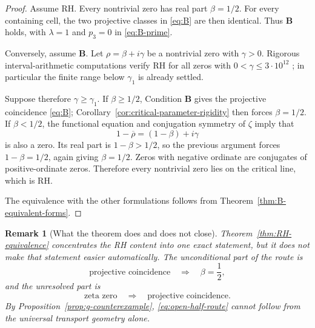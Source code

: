\documentclass[11pt]{amsart}
\numberwithin{equation}{section}
\newtheorem{remark}[theorem]{Remark}
\begin{document}
\begin{proof}
Assume RH.  Every nontrivial zero has real part $\beta=1/2$.  For every
containing cell, the two projective classes in \eqref{eq:B} are then
identical.  Thus $\mathbf B$ holds, with $\lambda=1$ and $p_3=0$ in
\eqref{eq:B-prime}.

Conversely, assume $\mathbf B$.  Let $\rho=\beta+i\gamma$ be a nontrivial
zero with $\gamma>0$.  Rigorous interval-arithmetic computations verify RH for
all zeros with $0<\gamma\leq3\cdot10^{12}$
\cite{PlattTrudgian2021}; in particular the finite range below
$\gamma_1$ is already settled.

Suppose therefore $\gamma\geq\gamma_1$.  If $\beta\geq1/2$, Condition
$\mathbf B$ gives the projective coincidence \eqref{eq:B};
Corollary~\ref{cor:critical-parameter-rigidity} then forces
$\beta=1/2$.  If $\beta<1/2$, the functional equation and conjugation symmetry
of $\zeta$ imply that
\begin{equation}
 1-\overline\rho=(1-\beta)+i\gamma
 \label{eq:zero-symmetry}
\end{equation}
is also a zero.  Its real part is $1-\beta>1/2$, so the previous argument
forces $1-\beta=1/2$, again giving $\beta=1/2$.  Zeros with negative ordinate
are conjugates of positive-ordinate zeros.  Therefore every nontrivial zero
lies on the critical line, which is RH.

The equivalence with the other formulations follows from
Theorem~\ref{thm:B-equivalent-forms}.
\end{proof}

\begin{remark}[What the theorem does and does not close]
\label{rem:RH-content}
Theorem~\ref{thm:RH-equivalence} concentrates the RH content into one exact
statement, but it does not make that statement easier automatically.  The
unconditional part of the route is
\begin{equation}
 \text{projective coincidence}
 \quad\Longrightarrow\quad
 \beta=\frac12,
 \label{eq:closed-half-route}
\end{equation}
and the unresolved part is
\begin{equation}
 \text{zeta zero}
 \quad\Longrightarrow\quad
 \text{projective coincidence}.
 \label{eq:open-half-route}
\end{equation}
By Proposition~\ref{prop:g-counterexample},
\eqref{eq:open-half-route} cannot follow from the universal transport geometry
alone.
\end{remark}
\end{document}
